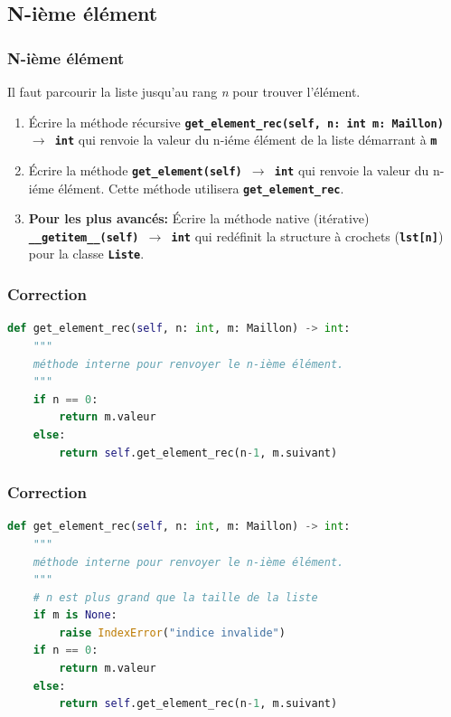 \documentclass[svgnames,11pt]{beamer}
\begin{document}
\subsection{N-ième élément}
\begin{frame}
    \frametitle{N-ième élément}

    Il faut parcourir la liste jusqu'au rang \emph{n} pour trouver l'élément.
    \begin{activite}
        \begin{enumerate}
            \item Écrire la méthode récursive \textbf{\texttt{get\_element\_rec(self, n: int m: Maillon) $\rightarrow$ int}} qui renvoie la valeur du n-iéme élément de la liste démarrant à \textbf{\texttt{m}}
            \item Écrire la méthode \textbf{\texttt{get\_element(self) $\rightarrow$ int}} qui renvoie la valeur du n-iéme élément. Cette méthode utilisera \textbf{\texttt{get\_element\_rec}}.
            \item \textbf{Pour les plus avancés:} Écrire la méthode native (itérative) \textbf{\texttt{\_\_getitem\_\_(self) $\rightarrow$ int}} qui redéfinit la structure à crochets (\textbf{\texttt{lst[n]}}) pour la classe \textbf{\texttt{Liste}}.
        \end{enumerate}
    \end{activite}

\end{frame}
\begin{frame}[fragile]
    \frametitle{Correction}

    \begin{center}
    \begin{lstlisting}[language=Python , basicstyle=\ttfamily\small, xleftmargin=0em, xrightmargin=0em]
def get_element_rec(self, n: int, m: Maillon) -> int:
    """
    méthode interne pour renvoyer le n-ième élément.
    """
    if n == 0:
        return m.valeur
    else:
        return self.get_element_rec(n-1, m.suivant)
\end{lstlisting}
    \end{center}

\end{frame}
\begin{frame}[fragile]
    \frametitle{Correction}

    \begin{center}
    \begin{lstlisting}[language=Python , basicstyle=\ttfamily\small, xleftmargin=0em, xrightmargin=0em]
def get_element_rec(self, n: int, m: Maillon) -> int:
    """
    méthode interne pour renvoyer le n-ième élément.
    """
    # n est plus grand que la taille de la liste
    if m is None:
        raise IndexError("indice invalide")
    if n == 0:
        return m.valeur
    else:
        return self.get_element_rec(n-1, m.suivant)
\end{lstlisting}
    \label{CODE}
    \end{center}

\end{frame}
\end{document}
